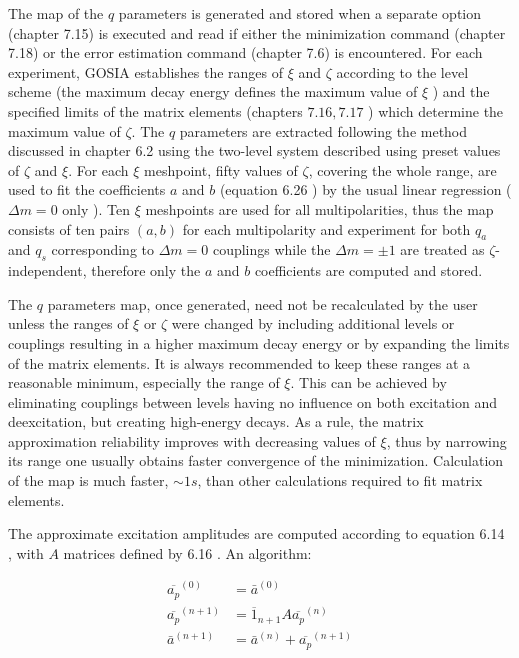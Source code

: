 \documentclass[10pt]{article}
\begin{document}
The map of the $q$ parameters is generated and stored when a separate option (chapter 7.15) is executed and read if either the minimization command (chapter 7.18) or the error estimation command (chapter 7.6) is encountered. For each experiment, GOSIA establishes the ranges of $\xi$ and $\zeta$ according to the level scheme (the maximum decay energy defines the maximum value of $\xi$ ) and the specified limits of the matrix elements (chapters $7.16,7.17$ ) which determine the maximum value of $\zeta$. The $q$ parameters are extracted following the method discussed in chapter 6.2 using the two-level system described using preset values of $\zeta$ and $\xi$. For each $\xi$ meshpoint, fifty values of $\zeta$, covering the whole range, are used to fit the coefficients $a$ and $b$ (equation 6.26 ) by the usual linear regression ( $\Delta m=0$ only ). Ten $\xi$ meshpoints are used for all multipolarities, thus the map consists of ten pairs $(a, b)$ for each multipolarity and experiment for both $q_{a}$ and $q_{s}$ corresponding to $\Delta m=0$ couplings while the $\Delta m= \pm 1$ are treated as $\zeta$-independent, therefore only the $a$ and $b$ coefficients are computed and stored.

The $q$ parameters map, once generated, need not be recalculated by the user unless the ranges of $\xi$ or $\zeta$ were changed by including additional levels or couplings resulting in a higher maximum decay energy or by expanding the limits of the matrix elements. It is always recommended to keep these ranges at a reasonable minimum, especially the range of $\xi$. This can be achieved by eliminating couplings between levels having no influence on both excitation and deexcitation, but creating high-energy decays. As a rule, the matrix approximation reliability improves with decreasing values of $\xi$, thus by narrowing its range one usually obtains faster convergence of the minimization. Calculation of the map is much faster, $\sim 1 s$, than other calculations required to fit matrix elements.

The approximate excitation amplitudes are computed according to equation 6.14 , with $A$ matrices defined by 6.16 . An algorithm:


\begin{align*}
{\overline{a_{p}}}^{(0)} & =\bar{a}^{(0)}  \tag{6.27}\\
{\overline{a_{p}}}^{(n+1)} & =\overline{1}_{n+1} A{\overline{a_{p}}}^{(n)} \\
\bar{a}^{(n+1)} & =\bar{a}^{(n)}+{\overline{a_{p}}}^{(n+1)}
\end{align*}
\end{document}
